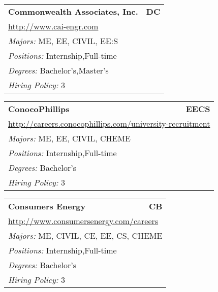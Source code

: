 \documentclass[twoside]{article}
\begin{document}
\begin{center}
\begin{multicols}{3}
\begin{FlushLeft}
\begin{minipage}{\columnwidth}
\end{minipage}
 
\begin{minipage}{\columnwidth}\begin{tabularx}{.95\columnwidth}{Xr}
                 {\Large\bf Commonwealth Associates, Inc.} & {\Large\bf DC}\\
    \multicolumn{2}{p{.95\columnwidth}}{\url{http://www.cai-engr.com}}\\
    \multicolumn{2}{p{.95\columnwidth}}{\emph{Majors:} ME, EE, CIVIL, EE:S}\\
    \multicolumn{2}{p{.95\columnwidth}}{\emph{Positions:} Internship,Full-time}\\
    \multicolumn{2}{p{.95\columnwidth}}{\emph{Degrees:} Bachelor's,Master's}\\
    \multicolumn{2}{p{.95\columnwidth}}{\emph{Hiring Policy:} 3}\\
    \end{tabularx}
    
\end{minipage}
 
\begin{minipage}{\columnwidth}\begin{tabularx}{.95\columnwidth}{Xr}
                 {\Large\bf ConocoPhillips} & {\Large\bf EECS}\\
    \multicolumn{2}{p{.95\columnwidth}}{\url{http://careers.conocophillips.com/university-recruitment}}\\
    \multicolumn{2}{p{.95\columnwidth}}{\emph{Majors:} ME, EE, CIVIL, CHEME}\\
    \multicolumn{2}{p{.95\columnwidth}}{\emph{Positions:} Internship,Full-time}\\
    \multicolumn{2}{p{.95\columnwidth}}{\emph{Degrees:} Bachelor's}\\
    \multicolumn{2}{p{.95\columnwidth}}{\emph{Hiring Policy:} 3}\\
    \end{tabularx}
    
\end{minipage}
 
\begin{minipage}{\columnwidth}\begin{tabularx}{.95\columnwidth}{Xr}
                 {\Large\bf Consumers Energy} & {\Large\bf CB}\\
    \multicolumn{2}{p{.95\columnwidth}}{\url{http://www.consumersenergy.com/careers}}\\
    \multicolumn{2}{p{.95\columnwidth}}{\emph{Majors:} ME, CIVIL, CE, EE, CS, CHEME}\\
    \multicolumn{2}{p{.95\columnwidth}}{\emph{Positions:} Internship,Full-time}\\
    \multicolumn{2}{p{.95\columnwidth}}{\emph{Degrees:} Bachelor's}\\
    \multicolumn{2}{p{.95\columnwidth}}{\emph{Hiring Policy:} 3}\\
    \end{tabularx}
    

\end{minipage}
\end{FlushLeft}
\end{multicols}
\end{center}
\end{document}
